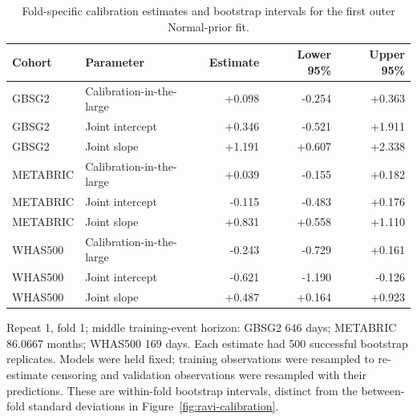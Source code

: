 \begin{table}[htbp]
\centering\small
\caption{Fold-specific calibration estimates and bootstrap intervals for the first outer Normal-prior fit.}
\label{tab:sup-calibration-bootstrap}
\begin{tabular}{@{}llrrr@{}}\toprule
Cohort & Parameter & Estimate & Lower 95\% & Upper 95\%\\\midrule
GBSG2 & Calibration-in-the-large & +0.098 & -0.254 & +0.363 \\
GBSG2 & Joint intercept & +0.346 & -0.521 & +1.911 \\
GBSG2 & Joint slope & +1.191 & +0.607 & +2.338 \\
METABRIC & Calibration-in-the-large & +0.039 & -0.155 & +0.182 \\
METABRIC & Joint intercept & -0.115 & -0.483 & +0.176 \\
METABRIC & Joint slope & +0.831 & +0.558 & +1.110 \\
WHAS500 & Calibration-in-the-large & -0.243 & -0.729 & +0.161 \\
WHAS500 & Joint intercept & -0.621 & -1.190 & -0.126 \\
WHAS500 & Joint slope & +0.487 & +0.164 & +0.923 \\
\bottomrule\end{tabular}
\par\smallskip\begin{minipage}{\linewidth}\footnotesize Repeat 1, fold 1; middle training-event horizon: GBSG2 646 days; METABRIC 86.0667 months; WHAS500 169 days. Each estimate had 500 successful bootstrap replicates. Models were held fixed; training observations were resampled to re-estimate censoring and validation observations were resampled with their predictions. These are within-fold bootstrap intervals, distinct from the between-fold standard deviations in Figure~\ref{fig:ravi-calibration}.\end{minipage}
\end{table}
